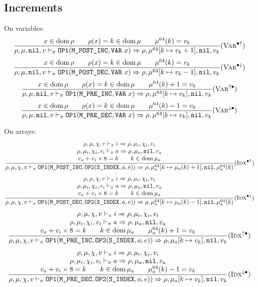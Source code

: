 \subsection{Increments}
On variables:
\[\dfrac{
    x\in\operatorname{dom}\rho \qquad \rho(x) = k \in\operatorname{dom}\mu \qquad \mu^{64}(k) = v_k
}{\rho,\mu,\texttt{nil},v \vdash_\pi \texttt{OP1}(\texttt{M\_POST\_INC}, \texttt{VAR}\ x) \Rightarrow \rho,\mu^{64}[k\mapsto v_k+1],\texttt{nil},v_k} (\textsc{Var}^{\bullet\uparrow})\]
\[\dfrac{
    x\in\operatorname{dom}\rho \qquad \rho(x) = k \in\operatorname{dom}\mu \qquad \mu^{64}(k) = v_k
}{\rho,\mu,\texttt{nil},v \vdash_\pi \texttt{OP1}(\texttt{M\_POST\_DEC}, \texttt{VAR}\ x) \Rightarrow \rho,\mu^{64}[k\mapsto v_k-1],\texttt{nil},v_k} (\textsc{Var}^{\bullet\downarrow})\]
\[\dfrac{
    x\in\operatorname{dom}\rho \qquad \rho(x) = k \in\operatorname{dom}\mu \qquad \mu^{64}(k)+1 = v_k
}{\rho,\mu,\texttt{nil},v \vdash_\pi \texttt{OP1}(\texttt{M\_PRE\_INC}, \texttt{VAR}\ x) \Rightarrow \rho,\mu^{64}[k\mapsto v_k],\texttt{nil},v_k} (\textsc{Var}^{\uparrow \bullet})\]
\[\dfrac{
    x\in\operatorname{dom}\rho \qquad \rho(x) = k \in\operatorname{dom}\mu \qquad \mu^{64}(k)-1 = v_k
}{\rho,\mu,\texttt{nil},v \vdash_\pi \texttt{OP1}(\texttt{M\_PRE\_DEC}, \texttt{VAR}\ x) \Rightarrow \rho,\mu^{64}[k\mapsto v_k],\texttt{nil},v_k} (\textsc{Var}^{\downarrow \bullet})\]

On arrays:
\[\dfrac{\begin{array}{c}
    \rho,\mu,\chi,v \vdash_\pi i\Rightarrow \rho,\mu_i,\chi_i,v_i \\
    \rho,\mu_i,\chi_i,v_i \vdash_\pi a\Rightarrow \rho,\mu_a,\texttt{nil},v_a \\
    v_a+v_i\times8 = k \qquad k\in\operatorname{dom}\mu_a
\end{array}}{\rho,\mu,\chi,v \vdash_\pi \texttt{OP1}(\texttt{M\_POST\_INC}, \texttt{OP2}(\texttt{S\_INDEX}, a, e)) \Rightarrow \rho,\mu_a^{64}[k \mapsto \mu_a(k)+1],\texttt{nil},\mu_a^{64}(k)}(\textsc{Idx}^{\bullet\uparrow})\]
\[\dfrac{\begin{array}{c}
    \rho,\mu,\chi,v \vdash_\pi i\Rightarrow \rho,\mu_i,\chi_i,v_i \\
    \rho,\mu_i,\chi_i,v_i \vdash_\pi a\Rightarrow \rho,\mu_a,\texttt{nil},v_a \\
    v_a+v_i\times8 = k \qquad k\in\operatorname{dom}\mu_a
\end{array}}{\rho,\mu,\chi,v \vdash_\pi \texttt{OP1}(\texttt{M\_POST\_DEC}, \texttt{OP2}(\texttt{S\_INDEX}, a, e)) \Rightarrow \rho,\mu_a^{64}[k \mapsto \mu_a(k)-1],\texttt{nil},\mu_a^{64}(k)}(\textsc{Idx}^{\bullet\downarrow})\]
\[\dfrac{\begin{array}{c}
    \rho,\mu,\chi,v \vdash_\pi i\Rightarrow \rho,\mu_i,\chi_i,v_i \\
    \rho,\mu_i,\chi_i,v_i \vdash_\pi a\Rightarrow \rho,\mu_a,\texttt{nil},v_a \\
    v_a+v_i\times8 = k \qquad k\in\operatorname{dom}\mu_a \qquad \mu_a^{64}(k)+1 = v_k
\end{array}}{\rho,\mu,\chi,v \vdash_\pi \texttt{OP1}(\texttt{M\_PRE\_INC}, \texttt{OP2}(\texttt{S\_INDEX}, a, e)) \Rightarrow \rho,\mu_a[k \mapsto v_k],\texttt{nil},v_k}(\textsc{Idx}^{\uparrow \bullet})\]
\[\dfrac{\begin{array}{c}
    \rho,\mu,\chi,v \vdash_\pi i\Rightarrow \rho,\mu_i,\chi_i,v_i \\
    \rho,\mu_i,\chi_i,v_i \vdash_\pi a\Rightarrow \rho,\mu_a,\texttt{nil},v_a \\
    v_a+v_i\times8 = k \qquad k\in\operatorname{dom}\mu_a \qquad \mu_a^{64}(k)-1 = v_k
\end{array}}{\rho,\mu,\chi,v \vdash_\pi \texttt{OP1}(\texttt{M\_PRE\_DEC}, \texttt{OP2}(\texttt{S\_INDEX}, a, e)) \Rightarrow \rho,\mu_a[k \mapsto v_k],\texttt{nil},v_k}(\textsc{Idx}^{\downarrow \bullet})\]

